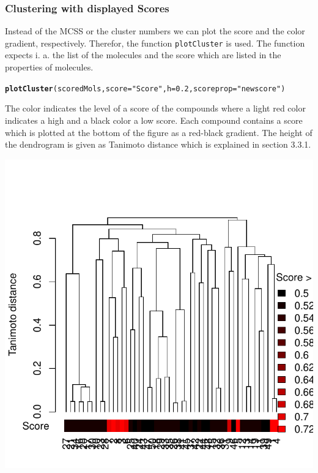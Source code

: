 \documentclass[12pt, a4paper]{scrartcl}\usepackage[]{graphicx}\usepackage[]{color}
\makeatletter
\def\maxwidth{ %
  \ifdim\Gin@nat@width>\linewidth
    \linewidth
  \else
    \Gin@nat@width
  \fi
}
\newcommand{\hlnum}[1]{\textcolor[rgb]{0.686,0.059,0.569}{#1}}%
\newcommand{\hlstr}[1]{\textcolor[rgb]{0.192,0.494,0.8}{#1}}%
\newcommand{\hlstd}[1]{\textcolor[rgb]{0.345,0.345,0.345}{#1}}%
\newcommand{\hlkwc}[1]{\textcolor[rgb]{0.333,0.667,0.333}{#1}}%
\newcommand{\hlkwd}[1]{\textcolor[rgb]{0.737,0.353,0.396}{\textbf{#1}}}%
\newenvironment{kframe}{%
 \def\at@end@of@kframe{}%
 \ifinner\ifhmode%
  \def\at@end@of@kframe{\end{minipage}}%
  \begin{minipage}{\columnwidth}%
 \fi\fi%
 \def\FrameCommand##1{\hskip\@totalleftmargin \hskip-\fboxsep
 \colorbox{shadecolor}{##1}\hskip-\fboxsep
     \hskip-\linewidth \hskip-\@totalleftmargin \hskip\columnwidth}%
 \MakeFramed {\advance\hsize-\width
   \@totalleftmargin\z@ \linewidth\hsize
   \@setminipage}}%
 {\par\unskip\endMakeFramed%
 \at@end@of@kframe}
\newenvironment{knitrout}{}{} %
\newcommand{\Rfunction}[1]{{\texttt{#1}}}
\makeatother
\begin{document}
\newpage
\subsubsection{Clustering with displayed Scores}
Instead of the MCSS or the cluster numbers we can plot the score and the color gradient, respectively.
Therefor, the function \Rfunction{plotCluster} is used. The function expects i. a. the list of the molecules
and the score which are listed in the properties of molecules.

\begin{knitrout}
\color{fgcolor}\begin{kframe}
\begin{alltt}
\hlkwd{plotCluster}\hlstd{(scoredMols,} \hlkwc{score}\hlstd{=}\hlstr{"Score"}\hlstd{,} \hlkwc{h}\hlstd{=}\hlnum{0.2}\hlstd{,} \hlkwc{scoreprop}\hlstd{=}\hlstr{"newscore"}\hlstd{)}
\end{alltt}
\end{kframe}
\end{knitrout}

The color indicates the level of a score of the compounds where a light red color indicates a high and a black
color a low score. Each compound contains a score which is plotted at the bottom of the figure as a red-black gradient. The height of the dendrogram is given as Tanimoto distance which is explained in section 3.3.1.

\begin{knitrout}
\color{fgcolor}

{\centering \includegraphics[width=\maxwidth]{figure/plotScoredDendrogram} 

}



\end{knitrout}
\end{document}
